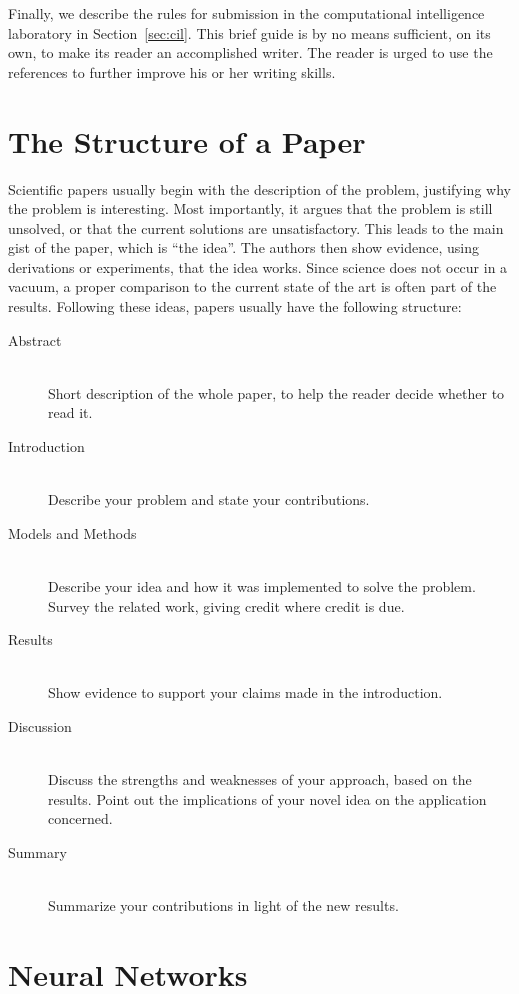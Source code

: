 \documentclass[10pt,conference,compsocconf]{IEEEtran}
\begin{document}
Finally, we describe the rules for submission in the computational
intelligence laboratory in Section~\ref{sec:cil}. 
This brief guide is by no means sufficient, on its own, to
make its reader an accomplished writer. The reader is urged to use the
references to further improve his or her writing skills.

\section{The Structure of a Paper}
\label{sec:structure-paper}

Scientific papers usually begin with the description of the problem,
justifying why the problem is interesting. Most importantly, it argues
that the problem is still unsolved, or that the current solutions are
unsatisfactory. This leads to the main gist of the paper, which is
``the idea''. The authors then show evidence, using derivations or
experiments, that the idea works. Since science does not occur in a
vacuum, a proper comparison to the current state of the art is often
part of the results. Following these ideas, papers usually have the
following structure:
\begin{description}
\item[Abstract] \ \\
  Short description of the whole paper, to help the
  reader decide whether to read it.
\item[Introduction] \ \\
  Describe your problem and state your
  contributions.
\item[Models and Methods] \ \\
  Describe your idea and how it was implemented to solve
  the problem. Survey the related work, giving credit where credit is
  due.
\item[Results] \ \\
  Show evidence to support your claims made in the
  introduction.
\item[Discussion] \ \\
  Discuss the strengths and weaknesses of your
  approach, based on the results. Point out the implications of your
  novel idea on the application concerned.
\item[Summary] \ \\
  Summarize your contributions in light of the new
  results.
\end{description}


\section{Neural Networks}
\label{sec:tips-writing}
\end{document}
